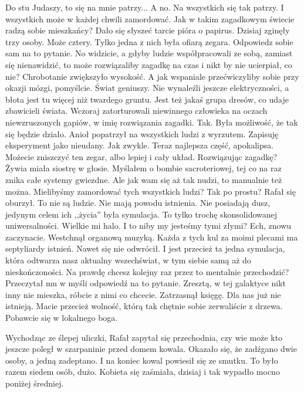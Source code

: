 \begin{dialogue}
	\ds{} Do stu Judaszy, to się na mnie patrzy...
	\ds{} A no. Na wszystkich się tak patrzy. I wszystkich może w każdej chwili zamordować.
	\ds{} Jak w takim zagadkowym świecie radzą sobie mieszkańcy? 
		\dm{} Dało się słyszeć tarcie pióra o papirus.
	\ds{} Dzisiaj zginęły trzy osoby. Może cztery. Tylko jedna z nich była ofiarą zegara. Odpowiedz sobie sam na to pytanie.
	\ds{} No widzicie, a gdyby ludzie współpracowali ze sobą, zamiast się nienawidzić, to może rozwiązaliby zagadkę na czas i nikt by nie ucierpiał, co nie?
		\dm{} Chrobotanie zwiększyło wysokość. \dm{} A jak wspaniale przećwiczyliby sobie przy okazji mózgi, pomyślcie. Świat geniuszy.
	\ds{} Nie wynaleźli jeszcze elektryczności, a błota jest tu więcej niż twardego gruntu. Jest też jakaś grupa dresów, co udaje zbawicieli świata. 
		Wczoraj zatorturowali niewinnego człowieka na oczach niewzruszonych gapiów, w imię rozwiązania zagadki.
	\ds{} Tak. Była możliwość, że tak się będzie działo. \dm{} Anioł popatrzył na wszystkich ludzi z wyrzutem. \dm{} Zapisuję eksperyment jako nieudany. Jak zwykle. Teraz najlepsza część, apokalipsa. Możecie zniszczyć ten zegar, albo lepiej i cały układ.
	\ds{} Rozwiązując zagadkę?
		\dm{} Żywia miała siostrę w głosie.
	\ds{} Myślałem o bombie sacroteriowej, tej co na raz znika całe systemy gwiezdne. Ale jak wam się aż tak nudzi, to manualnie też można.
	\ds{} Mielibyśmy zamordować tych wszystkich ludzi? Tak po prostu? \dm{} Rafał się oburzył.
	\ds{} To nie są ludzie. Nie mają powodu istnienia. Nie posiadają dusz, jedynym celem ich ,,życia'' była symulacja. To tylko trochę skonsolidowanej uniwersalności. Wielkie mi halo.
	\ds{} I to niby my jesteśmy tymi złymi?
	\ds{} Ech, znowu zaczynacie. 
		\dm{} Westchnął organową muzyką.
		\dm{} Każda z tych kul za moimi plecami ma septyliardy istnień. 
		\dm{} Nawet się nie odwrócił. 
		\dm{} I jest przecież ta jedna symulacja, która odtwarza nasz aktualny wszechświat, w tym siebie samą aż do nieskończoności. Na prawdę chcesz kolejny raz przez to mentalnie przechodzić?
		\dm{} Przeczytał mu w myśli odpowiedź na to pytanie.
		\dm{} Zresztą, w tej galaktyce nikt inny nie mieszka, róbcie z nimi co chcecie.
		\dm{} Zatrzasnął księgę. 
		\dm{} Dla nas już nie istnieją. Macie przecież wolność, którą tak chętnie sobie zerwaliście z drzewa. Pobawcie się w lokalnego boga.
\end{dialogue}

Wychodząc ze ślepej uliczki, Rafał zapytał się przechodnia, czy wie może kto jeszcze poległ w szarpaninie przed domem kowala. 
Okazało się, że zadźgano dwie osoby, a jedną zadeptano. I na koniec kowal powiesił się ze smutku. To było razem siedem osób, dużo.
Kobieta się zaśmiała, dzisiaj i tak wypadło mocno poniżej średniej.

